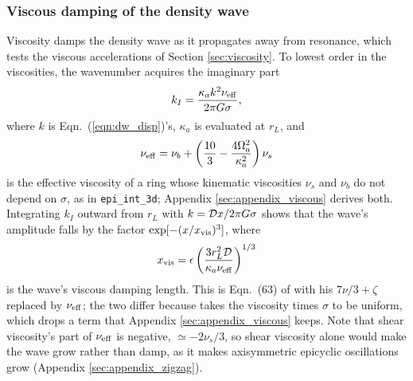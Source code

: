 \documentclass[twocolumn]{aastex702}
\newcommand{\code}[1]{\texttt{#1}}   %
\begin{document}
\subsubsection{Viscous damping of the density wave}
\label{sec:density_viscous}

Viscosity damps the density wave as it propagates away from resonance, which tests the viscous accelerations of
Section \ref{sec:viscosity}. To lowest order in the viscosities, the wavenumber acquires the imaginary part
\begin{equation}
    \label{eqn:dw_kI}
    k_I = \frac{\kappa_ak^2\nu_{\rm eff}}{2\pi G\sigma},
\end{equation}
where $k$ is Eqn.\ (\ref{eqn:dw_disp})'s, $\kappa_a$ is evaluated at $r_L$, and
\begin{equation}
    \label{eqn:dw_nueff}
    \nu_{\rm eff} = \nu_b + \left(\frac{10}{3} - \frac{4\Omega_a^2}{\kappa_a^2}\right)\nu_s
\end{equation}
is the effective viscosity of a ring whose kinematic viscosities $\nu_s$ and $\nu_b$ do not depend on $\sigma$, as
in \code{epi\_int\_3d}; Appendix \ref{sec:appendix_viscous} derives both. Integrating $k_I$ outward from $r_L$ with
$k = {\cal D}x/2\pi G\sigma$ shows that the wave's amplitude falls by the factor $\exp[-(x/x_{\rm vis})^3]$, where
\begin{equation}
    \label{eqn:dw_xvis}
    x_{\rm vis} = \epsilon\left(\frac{3r_L^2{\cal D}}{\kappa_a\nu_{\rm eff}}\right)^{1/3}
\end{equation}
is the wave's viscous damping length. This is Eqn.\ (63) of \cite{S84} with his $7\nu/3 + \zeta$ replaced by
$\nu_{\rm eff}$; the two differ because \cite{S84} takes the viscosity times $\sigma$ to be uniform, which drops a
term that Appendix \ref{sec:appendix_viscous} keeps. Note that shear viscosity's part of $\nu_{\rm eff}$ is
negative, $\simeq -2\nu_s/3$, so shear viscosity alone would make the wave grow rather than damp, as it makes
axisymmetric epicyclic oscillations grow (Appendix \ref{sec:appendix_zigzag}).
\end{document}
